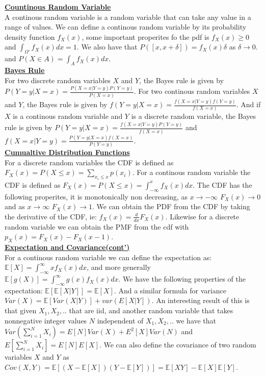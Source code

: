 \documentclass[9.5pt]{article}
\author{Lawrence Liu}
\begin{document}

\underline{\textbf{Countinous Random Variable}}\\
A continous random variable is a random variable that can take any value in a range of values. 
We can define a continous random variable by its probability density function $f_X(x)$, 
some important properites fo the pdf is $f_X(x) \geq 0$ and $\int_{\Omega'} f_X(x) dx = 1$. We also
have that $P([x,x+\delta])=f_X(x)\delta$ as $\delta \rightarrow 0$. and $P(X \in A) = \int_A f_X(x) dx$.\\
\underline{\textbf{Bayes Rule}}\\
For two discrete random variables $X$ and $Y$, the Bayes rule is given by $P(Y=y|X=x) = \frac{P(X=x|Y=y)P(Y=y)}{P(X=x)}$.
For two continous random variables $X$ and $Y$, the Bayes rule is given by $f(Y=y|X=x) = \frac{f(X=x|Y=y)f(Y=y)}{f(X=x)}$.
And if $X$ is a continous random variable and $Y$ is a discrete random variable, the Bayes rule is given by $P(Y=y|X=x) = \frac{f(X=x|Y=y)P(Y=y)}{f(X=x)}$
and $f(X=x|Y=y) = \frac{P(Y=y|X=x)f(X=x)}{P(Y=y)}$.\\
\underline{\textbf{Cumualtive Distribution Functions}}\\
For a discrete random variables the CDF is defined as $F_X(x) = P(X \leq x) = \sum_{x_i \leq x} p(x_i)$.
For a continous random variable the CDF is defined as $F_X(x) = P(X \leq x) = \int_{-\infty}^x f_X(x) dx$.
The CDF has the following properites, it is monotonically non decreasing, 
as $x\to -\infty$ $F_X(x) \to 0$ and as $x \to \infty$ $F_X(x) \to 1$.
We can obtain the PDF from the CDF by taking the derivative of the CDF, ie:
$f_X(x)=\frac{d}{dx}F_X(x)$. Likewise for a discrete random variable we can obtain the PMF
from the cdf with $p_X(x)=F_X(x)-F_X(x-1)$.\\
\underline{\textbf{Expectation and Covariance(cont')}}\\
For a continous random variable we can define the expectation as:
$\mathbb{E}[X] = \int_{-\infty}^{\infty} xf_X(x) dx$, and more generally
$\mathbb{E}[g(X)] = \int_{-\infty}^{\infty} g(x)f_X(x) dx$. We have the following 
properties of the expectation: $\mathbb{E}[\mathbb{E}[X|Y]]=\mathbb{E}[X]$. And 
a similar formula for variance $Var(X)=\mathbb{E}[Var(X|Y)]+var(E[X|Y])$.
An interesting result of this is that given $X_1,X_2,..$ that 
are iid, and another random variable that takes nonnegative integer values $N$ independent 
of $X_1,X_2,..$ we have that $Var(\sum_{i=1}^N X_i) = E[N]Var(X)+E^2[X]Var(N)$
and $E[\sum_{i=1}^N X_i] = E[N]E[X]$.
We can also define the covariance of two random variables $X$ and $Y$ as $Cov(X,Y)=\mathbb{E}[(X-\mathbb{E}[X])(Y-\mathbb{E}[Y])]=\mathbb{E}[XY]-\mathbb{E}[X]\mathbb{E}[Y]$.
\end{document}
